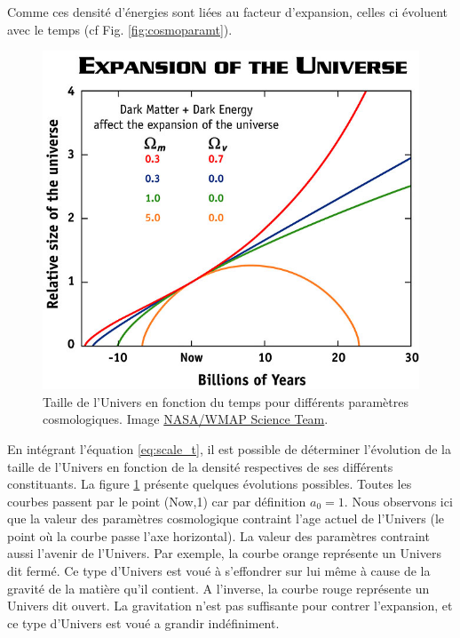 Comme ces densité d'énergies sont liées au facteur d'expansion, celles ci évoluent avec le temps (cf Fig. \ref{fig:cosmoparamt}).

\begin{figure}[bth]
        \includegraphics[width=.9\linewidth]{img/01/scale_t.jpg} 
        \caption[Taille de l'Univers]{Taille de l'Univers en fonction du temps pour différents paramètres cosmologiques.
		Image \href{https://map.gsfc.nasa.gov/universe/bb_concepts_exp.html}{NASA/WMAP Science Team}.
 		\label{fig:scale_t}}
\end{figure}

En intégrant l’équation \ref{eq:scale_t}, il est possible de déterminer l'évolution de la taille de l'Univers en fonction de la densité respectives de ses différents constituants.
La figure \ref{fig:scale_t} présente quelques évolutions possibles.
Toutes les courbes passent par le point (Now,1) car par définition $a_0 = 1$.
Nous observons ici que la valeur des paramètres cosmologique contraint l'age actuel de l'Univers (le point où la courbe passe l'axe horizontal).
La valeur des paramètres contraint aussi l'avenir de l'Univers.
Par exemple, la courbe orange représente un Univers dit fermé.
Ce type d'Univers est voué à s'effondrer sur lui même à cause de la gravité de la matière qu'il contient.
A l'inverse, la courbe rouge représente un Univers dit ouvert.
La gravitation n'est pas suffisante pour contrer l'expansion, et ce type d'Univers est voué a grandir indéfiniment.

